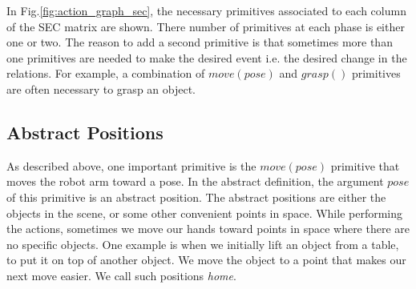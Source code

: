 In Fig.\ref{fig:action_graph_sec}, the necessary primitives associated to each column of the SEC matrix are shown.
There number of primitives at each phase is either one or two.
The reason to add a second primitive is that sometimes more than one primitives are needed to make the desired event i.e. the desired change in the relations.
For example, a combination of $move(pose)$ and $grasp()$ primitives are often necessary to grasp an object.

\subsection{Abstract Positions}

As described above, one important primitive is the $move(pose)$ primitive that moves the robot arm toward a pose.
In the abstract definition, the argument $pose$ of this primitive is an abstract position.
The abstract positions are either the objects in the scene, or some other convenient points in space.
While performing the actions, sometimes we move our hands toward points in space where there are no specific objects.
One example is when we initially lift an object from a table, to put it on top of another object.
We move the object to a point that makes our next move easier.
We call such positions \textit{home}.

